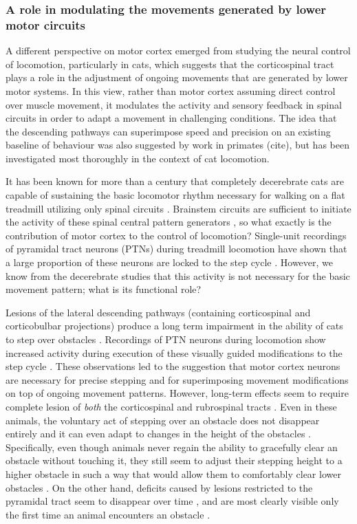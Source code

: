 \subsubsection*{A role in modulating the movements generated by lower motor circuits}

A different perspective on motor cortex emerged from studying the neural control of locomotion, particularly in cats, which suggests that the corticospinal tract plays a role in the adjustment of ongoing movements that are generated by lower motor systems. In this view, rather than motor cortex assuming direct control over muscle movement, it modulates the activity and sensory feedback in spinal circuits in order to adapt a movement in challenging conditions. The idea that the descending pathways can superimpose speed and precision on an existing baseline of behaviour was also suggested by work in primates (cite), but has been investigated most thoroughly in the context of cat locomotion.

It has been known for more than a century that completely decerebrate cats are capable of sustaining the basic locomotor rhythm necessary for walking on a flat treadmill utilizing only spinal circuits \cite{GrahamBrown1911}. Brainstem circuits are sufficient to initiate the activity of these spinal central pattern generators \cite{Grillner1973}, so what exactly is the contribution of motor cortex to the control of locomotion? Single-unit recordings of pyramidal tract neurons (PTNs) during treadmill locomotion have shown that a large proportion of these neurons are locked to the step cycle \cite{Armstrong1984a}. However, we know from the decerebrate studies that this activity is not necessary for the basic movement pattern; what is its functional role?

Lesions of the lateral descending pathways (containing corticospinal and corticobulbar projections) produce a long term impairment in the ability of cats to step over obstacles \cite{Drew2002}. Recordings of PTN neurons during locomotion show increased activity during execution of these visually guided modifications to the step cycle \cite{Drew1996}. These observations led to the suggestion that motor cortex neurons are necessary for precise stepping and for superimposing movement modifications on top of ongoing movement patterns. However, long-term effects seem to require complete lesion of \emph{both} the corticospinal and rubrospinal tracts \cite{Drew2002}. Even in these animals, the voluntary act of stepping over an obstacle does not disappear entirely and it can even adapt to changes in the height of the obstacles \cite{Drew2002}. Specifically, even though animals never regain the ability to gracefully clear an obstacle without touching it, they still seem to adjust their stepping height to a higher obstacle in such a way that would allow them to comfortably clear lower obstacles \cite{Drew2002}. On the other hand, deficits caused by lesions restricted to the pyramidal tract seem to disappear over time \cite{Liddell1944}, and are most clearly visible only the first time an animal encounters an obstacle \cite{Liddell1944}.

